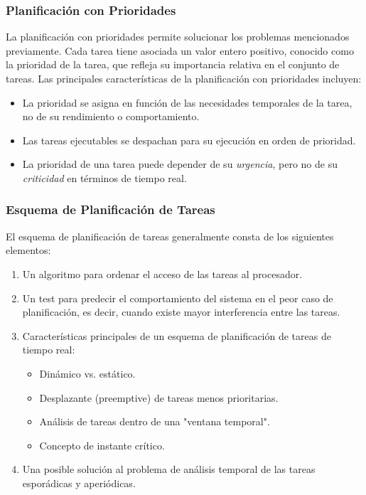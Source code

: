 \documentclass[a4paper,12pt]{article}
\begin{document}
\subsubsection{Planificación con Prioridades}

La planificación con prioridades permite solucionar los problemas mencionados previamente. Cada tarea tiene asociada un valor entero positivo, conocido como la prioridad de la tarea, que refleja su importancia relativa en el conjunto de tareas. Las principales características de la planificación con prioridades incluyen:

\begin{itemize}
    \item La prioridad se asigna en función de las necesidades temporales de la tarea, no de su rendimiento o comportamiento.
    \item Las tareas ejecutables se despachan para su ejecución en orden de prioridad.
    \item La prioridad de una tarea puede depender de su \textit{urgencia}, pero no de su \textit{criticidad} en términos de tiempo real.
\end{itemize}

\subsubsection{Esquema de Planificación de Tareas}

El esquema de planificación de tareas generalmente consta de los siguientes elementos:

\begin{enumerate}
    \item Un algoritmo para ordenar el acceso de las tareas al procesador.
    \item Un test para predecir el comportamiento del sistema en el peor caso de planificación, es decir, cuando existe mayor interferencia entre las tareas.
    \item Características principales de un esquema de planificación de tareas de tiempo real:
    \begin{itemize}
        \item Dinámico vs. estático.
        \item Desplazante (preemptive) de tareas menos prioritarias.
        \item Análisis de tareas dentro de una "ventana temporal".
        \item Concepto de instante crítico.
    \end{itemize}
    \item Una posible solución al problema de análisis temporal de las tareas esporádicas y aperiódicas.
\end{enumerate}
\end{document}
